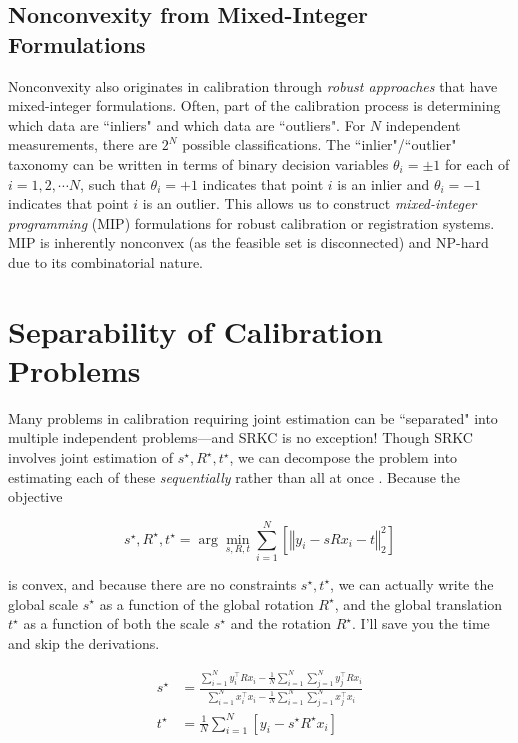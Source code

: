 \documentclass[conference]{IEEEtran}
\begin{document}
\subsection{Nonconvexity from Mixed-Integer Formulations}

Nonconvexity also originates in calibration through \textit{robust approaches} that have mixed-integer formulations.  Often, part of the calibration process is determining which data are ``inliers" and which data are ``outliers".  For \( N \) independent measurements, there are \( 2^N \) possible classifications.  The ``inlier"/``outlier" taxonomy can be written in terms of binary decision variables \( \theta_i = \pm 1 \) for each of \( i = 1, 2, \cdots N \), such that \( \theta_i = +1 \) indicates that point \( i \) is an inlier and \( \theta_i = -1 \) indicates that point \( i \) is an outlier.  This allows us to construct \textit{mixed-integer programming} (MIP) formulations for robust calibration or registration systems.  MIP is inherently nonconvex (as the feasible set is disconnected) and NP-hard due to its combinatorial nature.

\section{Separability of Calibration Problems}

Many problems in calibration requiring joint estimation can be ``separated" into multiple independent problems---and SRKC is no exception!  Though SRKC involves joint estimation of \( s^\star, R^\star, t^\star \), we can decompose the problem into estimating each of these \textit{sequentially} rather than all at once \cite{teaser}.  Because the objective

\begin{equation}
	s^\star, R^\star, t^\star = \arg\min_{s, R, t} \sum_{i=1}^N \left[\left\Vert y_i - s R x_i - t \right\Vert_2^2 \right]
\end{equation}

is convex, and because there are no constraints \( s^\star, t^\star \), we can actually write the global scale \( s^\star \) as a function of the global rotation \( R^\star \), and the global translation \( t^\star \) as a function of both the scale \( s^\star \) and the rotation \( R^\star \).  I'll save you the time and skip the derivations.

\begin{align}
	s^\star &= \frac{\sum_{i=1}^N y_i^\top R x_i - \frac1N \sum_{i=1}^N \sum_{j=1}^N y_j^\top R x_i}{\sum_{i=1}^N x_i^\top x_i - \frac1N \sum_{i=1}^N \sum_{j=1}^N x_j^\top x_i} \\
	t^\star &= \frac1N \sum_{i=1}^N \left[ y_i - s^\star R^\star x_i \right]
\end{align}
\end{document}
